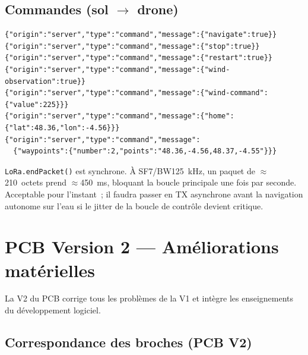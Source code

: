 \documentclass[12pt,a4paper]{article}
\begin{document}
\subsection{Commandes (sol $\to$ drone)}

\begin{lstlisting}[style=json, caption={Commandes support\'ees}]
{"origin":"server","type":"command","message":{"navigate":true}}
{"origin":"server","type":"command","message":{"stop":true}}
{"origin":"server","type":"command","message":{"restart":true}}
{"origin":"server","type":"command","message":{"wind-observation":true}}
{"origin":"server","type":"command","message":{"wind-command":{"value":225}}}
{"origin":"server","type":"command","message":{"home":{"lat":48.36,"lon":-4.56}}}
{"origin":"server","type":"command","message":
  {"waypoints":{"number":2,"points":"48.36,-4.56,48.37,-4.55"}}}
\end{lstlisting}

\begin{infobox}
  \texttt{LoRa.endPacket()} est synchrone. À SF7/BW125~kHz, un paquet de
  $\approx$210~octets prend $\approx$450~ms, bloquant la boucle principale une fois
  par seconde. Acceptable pour l'instant~; il faudra passer en TX asynchrone avant la
  navigation autonome sur l'eau si le jitter de la boucle de contr\^ole devient
  critique.
\end{infobox}

\section{PCB Version 2 --- Am\'eliorations mat\'erielles}

La V2 du PCB corrige tous les probl\`emes de la V1 et int\`egre les enseignements du
d\'eveloppement logiciel.

\subsection{Correspondance des broches (PCB V2)}
\end{document}
